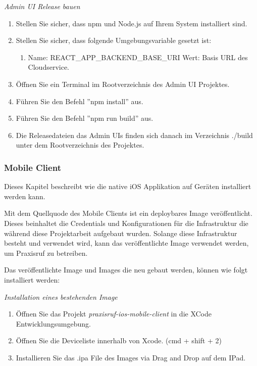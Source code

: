 \textit{Admin UI Release bauen}

\begin{enumerate}
    \item Stellen Sie sicher, dass npm und Node.js auf Ihrem System installiert sind.
    \item Stellen Sie sicher, dass folgende Umgebungsvariable gesetzt ist:
    \begin{enumerate}
        \item Name: REACT\_APP\_BACKEND\_BASE\_URI   Wert: Basis URL des Cloudservice.   
    \end{enumerate}
    \item Öffnen Sie ein Terminal im Rootverzeichnis des Admin UI Projektes.
    \item Führen Sie den Befehl ''npm install''  aus.
    \item Führen Sie den Befehl ''npm run build'' aus.
    \item Die Releasedateien das Admin UIs finden sich danach im Verzeichnis ./build unter dem Rootverzeichnis des Projektes. 
\end{enumerate}


\clearpage

\subsubsection*{Mobile Client}

Dieses Kapitel beschreibt wie die native iOS Applikation auf Geräten installiert werden kann.

Mit dem Quellquode des Mobile Clients ist ein deploybares Image veröffentlicht.
Dieses beinhaltet die Credentials und Konfigurationen für die Infrastruktur die während diese Projektarbeit aufgebaut wurden.
Solange diese Infrastruktur besteht und verwendet wird, kann das veröffentlichte Image verwendet werden, um Praxisruf zu betreiben.

Das veröffentlichte Image und Images die neu gebaut werden, können wie folgt installiert werden:

\textit{Installation eines bestehenden Image}

\begin{enumerate}
    \item Öffnen Sie das Projekt \textit{praxisruf-ios-mobile-client} in die XCode Entwicklungsumgebung.
    \item Öffnen Sie die Deviceliste innerhalb von Xcode. (cmd + shift + 2)
    \item Installieren Sie das .ipa File des Images via Drag and Drop auf dem IPad.
\end{enumerate}


